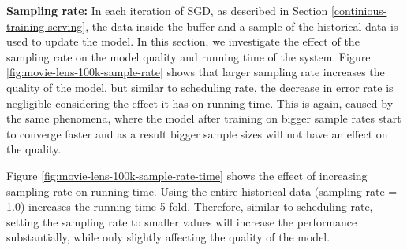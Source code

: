 \documentclass{vldb}
\begin{document}
\textbf{Sampling rate:} In each iteration of SGD, as described in Section \ref{continious-training-serving}, the data inside the buffer and a sample of the historical data is used to update the model.
In this section, we investigate the effect of the sampling rate on the model quality and running time of the system.
Figure \ref{fig:movie-lens-100k-sample-rate} shows that larger sampling rate increases the quality of the model, but similar to scheduling rate, the decrease in error rate is negligible considering the effect it has on running time. 
This is again, caused by the same phenomena, where the model after training on bigger sample rates start to converge faster and as a result bigger sample sizes will not have an effect on the quality.
 
Figure \ref{fig:movie-lens-100k-sample-rate-time} shows the effect of increasing sampling rate on running time.
Using the entire historical data (sampling rate = 1.0) increases the running time 5 fold. 
Therefore, similar to scheduling rate, setting the sampling rate to smaller values will increase the performance substantially, while only slightly affecting the quality of the model.
\end{document}

